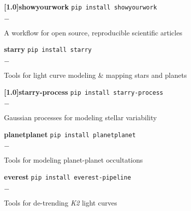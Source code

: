 \documentclass[]{luger-cv} %
\begin{document}
\begin{entrylist}

    
    \entry
    {\textbf{\scalebox{.85}[1.0]{showyourwork}}}
    {\textnormal{\texttt{pip install showyourwork}}}
    {}
    {%
        \vspace{-1em}
        \begin{list}{{\color{numcolor}$-$}}{\cvlist}
            \item A workflow for open source, reproducible scientific articles
        \end{list}
    }


    \entry
    {\textbf{starry}}
    {\textnormal{\texttt{pip install starry}}}
    {}
    {%
        \vspace{-1em}
        \begin{list}{{\color{numcolor}$-$}}{\cvlist}
            \item Tools for light curve modeling \& mapping stars and planets
        \end{list}
    }


    \entry
    {\textbf{\scalebox{.85}[1.0]{starry-process}}}
    {\textnormal{\texttt{pip install starry-process}}}
    {}
    {%
        \vspace{-1em}
        \begin{list}{{\color{numcolor}$-$}}{\cvlist}
            \item Gaussian processes for modeling stellar variability
        \end{list}
    }


    \entry
    {\textbf{planetplanet}}
    {\textnormal{\texttt{pip install planetplanet}}}
    {}
    {%
        \vspace{-1em}
        \begin{list}{{\color{numcolor}$-$}}{\cvlist}
            \item Tools for modeling planet-planet occultations
        \end{list}
    }


    \entry
    {\textbf{everest}}
    {\textnormal{\texttt{pip install everest-pipeline}}}
    {}
    {%
        \vspace{-1em}
        \begin{list}{{\color{numcolor}$-$}}{\cvlist}
            \item Tools for de-trending \emph{K2} light curves\\[-0.5em]
        \end{list}
    }


\end{entrylist}
\end{document}
